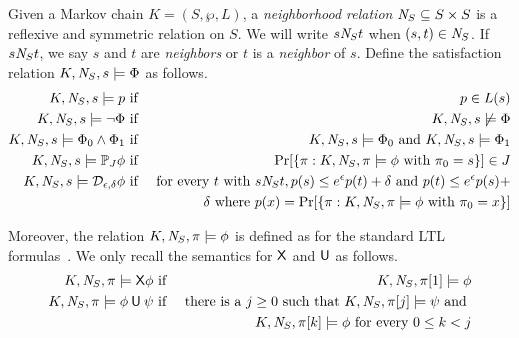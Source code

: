 
Given a Markov chain $K = (S, \wp, L)$, a
\emph{neighborhood relation} $\mathit{N}_{S} \subseteq S \times S$
is a reflexive and symmetric relation on $S$. We will write $s
\mathit{N}_{S} t$ when $(s, t) \in \mathit{N}_{S}$. If $s \mathit{N}_{S} t$,
we say $s$ and $t$ are \emph{neighbors} or $t$ is a \emph{neighbor} of
$s$. Define the satisfaction relation $K, \mathit{N}_{S}, s
\models \Phi$ as follows.
\begin{eqnarray*}
  K, \mathit{N}_{S}, s \models p
  & \textmd{ if } &
  p \in L(s)\\
  K, \mathit{N}_{S}, s \models \neg \Phi
  & \textmd{ if } &
  K, \mathit{N}_{S}, s \not\models \Phi\\
  K, \mathit{N}_{S}, s \models \Phi_0 \wedge \Phi_1
  & \textmd{ if } &
  K, \mathit{N}_{S}, s \models \Phi_0 \textmd{ and }
  K, \mathit{N}_{S}, s \models \Phi_1\\
  K, \mathit{N}_{S}, s \models \mathbb{P}_{J} \phi
  & \textmd{ if } &
  \Pr [\{ \pi : K, \mathit{N}_{S}, \pi \models \phi \textmd{ with }
                    \pi_0 = s\}] \in J \\
  K, \mathit{N}_{S}, s \models \mathcal{D}_{{\epsilon}, {\delta}} \phi
  & \textmd{ if } &
  \textmd{for every } t \textmd{ with }  s \mathit{N}_{S} t,
      p(s) \leq e^{\epsilon} p(t) + \delta \textmd{ and }
      p(t) \leq e^{\epsilon} p(s)  +  \\
  & &  \delta \textmd{ where } p(x) = \Pr [\{
      \pi : K, \mathit{N}_{S}, \pi \models \phi \textmd{ with }
      \pi_0 = x \}]
\end{eqnarray*}

Moreover, the relation $K, \mathit{N}_{S}, \pi \models \phi$ is defined as
for the standard LTL formulas~\cite{which-to-cite?}. We only recall the semantics for $\mathsf{X}$ and $\mathbin{\mathsf{U}}$ as follows.
\begin{eqnarray*}
  K, \neighbor{S}, \pi \models \X \phi
  & \textmd{ if } &
  K, \neighbor{S}, \pi[1] \models \phi\\
  K, \neighbor{S}, \pi \models \phi \until \psi
  & \textmd{ if } &
  \textmd{there is a } j \geq 0 \textmd{ such that }
  K, \neighbor{S}, \pi[j] \models \psi \textmd{ and } \\
  & & K, \neighbor{S}, \pi[k] \models \phi
      \textmd{ for every } 0 \leq k < j
\hide{
  K, \neighbor{S}, \pi \models \Phi \buntil{n} \Psi
  & \textmd{ if } &
  \textmd{there is a } 0 \leq j \leq n \textmd{ such that }
  K, \neighbor{S}, \pi[j] \models \Psi \textmd{ and } \\
  & & K, \neighbor{S}, \pi[k] \models \Phi
      \textmd{ for every } 0 \leq k < j
}
\end{eqnarray*}

